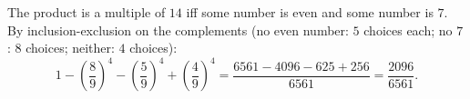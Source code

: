 The product is a multiple of $14$ iff some number is even and some number is $7$. By inclusion-exclusion on the complements (no even number: $5$ choices each; no $7$: $8$ choices; neither: $4$ choices):
\[1-\left(\dfrac89\right)^4-\left(\dfrac59\right)^4+\left(\dfrac49\right)^4=\dfrac{6561-4096-625+256}{6561}=\boxed{\dfrac{2096}{6561}}.\]
